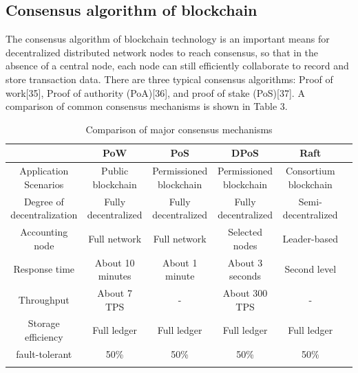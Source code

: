 \documentclass[lettersize,journal]{IEEEtran}
\begin{document}
\subsection{Consensus algorithm of blockchain}
The consensus algorithm of blockchain technology is an important means for decentralized distributed network nodes to reach consensus, so that in the absence of a central node, each node can still efficiently collaborate to record and store transaction data. There are three typical consensus algorithms: Proof of work[35], Proof of authority (PoA)[36], and proof of stake (PoS)[37]. A comparison of common consensus mechanisms is shown in Table 3.

\begin{table}[!ht]
\caption{Comparison of major consensus mechanisms}
\centering
    \begin{tabular}{cccccc}
   \Xhline{1.2pt}%
        ~ & PoW & PoS & DPoS & Raft  \\ \hline
        Application Scenarios & Public blockchain & Permissioned blockchain & Permissioned blockchain & Consortium blockchain  \\
        Degree of decentralization & Fully decentralized & Fully decentralized & Fully decentralized & Semi-decentralized  \\ 
        Accounting node & Full network & Full network & Selected nodes & Leader-based  \\ 
        Response time & About 10 minutes & About 1 minute & About 3 seconds & Second level  \\ 
        Throughput & About 7 TPS & - & About 300 TPS & -  \\ 
        Storage efficiency & Full ledger & Full ledger & Full ledger & Full ledger  \\ 
        fault-tolerant & 50\% & 50\% & 50\% & 50\%  \\ 
        \Xhline{1.2pt}%
    \end{tabular}
\end{table}
\end{document}

